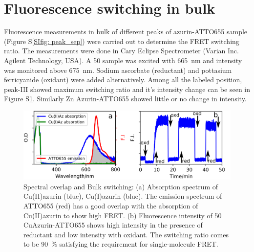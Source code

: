 \documentclass[11pt,a4paper,onecolumn]{article}
\begin{document}
\section{Fluorescence switching in bulk}
Fluorescence measurements in bulk of different peaks of azurin-ATTO655 sample (Figure S\ref{SIfig: peak_sep}) were carried out to determine the FRET switching ratio.
The measurements were done in Cary Eclipse Spectrometer (Varian Inc. Agilent Technology, USA).
A \SI{50}{\nM} sample was excited with \SI{665}{\nm} and intensity was monitored above \SI{675}{\nm}.
Sodium ascorbate (reductant) and pottasium ferricyanide (oxidant) were added alternatively.
Among all the labeled position, peak-III showed maximum switching ratio and it's intensity change can be seen in Figure S\ref{SIfig: switching}.
Similarly Zn Azurin-ATTO655 showed little or no change in intensity.
\begin{figure}
  \centering
  \includegraphics{spectral_overlap_switching}
  \makeatletter
  \renewcommand{\fnum@figure}{\figurename~S\thefigure}
  \makeatother
  \caption{Spectral overlap and Bulk switching: (a) Absorption spectrum of Cu(II)azurin (blue), Cu(I)azurin (blue).
  The emission spectrum of ATTO655 (red) has a good overlap with the absorption of Cu(II)azurin to show high FRET. 
  (b) Fluorescence intensity of \SI{50}{\nM} CuAzurin-ATTO655 shows high intensity in the presence of reductant and low 
  intensity with oxidant.
  The switching ratio comes to be \SI{90}{\percent} satisfying the requirement for single-molecule FRET.}
  \label{SIfig: switching}
\end{figure}
\end{document}
